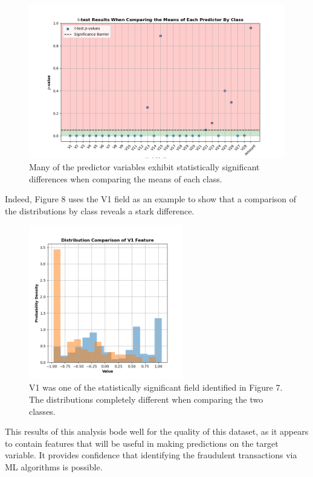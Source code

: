 \documentclass[11pt, oneside]{article}   	%
\begin{document}
\begin{figure}[h!]
    \centering
    \includegraphics[width=1.0\textwidth]{figures/fig_7.png}
    \captionsetup{font=small} 
    \caption{Many of the predictor variables exhibit statistically significant differences when comparing the means of each class.}
    \label{fig7}
\end{figure}

Indeed, Figure 8 uses the V1 field as an example to show that a comparison of the distributions by class reveals a stark difference.

\begin{figure}[h!]
    \centering
    \includegraphics[width=0.6\textwidth]{figures/fig_8.png}
    \captionsetup{font=small} 
    \caption{V1 was one of the statistically significant field identified in Figure 7. The distributions completely different when comparing the two classes.}
    \label{fig8}
\end{figure}

This results of this analysis bode well for the quality of this dataset, as it appears to contain features that will be useful in making predictions on the target variable. It provides confidence that identifying the fraudulent transactions via ML algorithms is possible.
\end{document}
